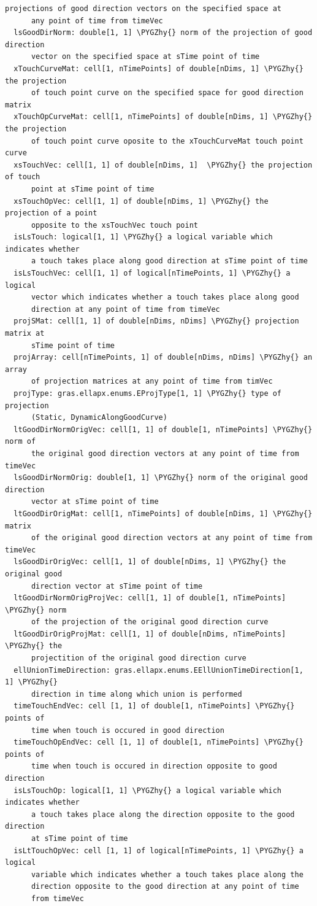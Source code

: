 \documentclass[letterpaper,10pt,english]{sphinxmanual}
\def\PYGZhy{\char`\-}
\begin{document}
\begin{Verbatim}[commandchars=\\\{\}]
      projections of good direction vectors on the specified space at
      any point of time from timeVec
  lsGoodDirNorm: double[1, 1] \PYGZhy{} norm of the projection of good direction
      vector on the specified space at sTime point of time
  xTouchCurveMat: cell[1, nTimePoints] of double[nDims, 1] \PYGZhy{} the projection
      of touch point curve on the specified space for good direction matrix
  xTouchOpCurveMat: cell[1, nTimePoints] of double[nDims, 1] \PYGZhy{} the projection
      of touch point curve oposite to the xTouchCurveMat touch point curve
  xsTouchVec: cell[1, 1] of double[nDims, 1]  \PYGZhy{} the projection of touch
      point at sTime point of time
  xsTouchOpVec: cell[1, 1] of double[nDims, 1] \PYGZhy{} the projection of a point
      opposite to the xsTouchVec touch point
  isLsTouch: logical[1, 1] \PYGZhy{} a logical variable which indicates whether
      a touch takes place along good direction at sTime point of time
  isLsTouchVec: cell[1, 1] of logical[nTimePoints, 1] \PYGZhy{} a logical
      vector which indicates whether a touch takes place along good
      direction at any point of time from timeVec
  projSMat: cell[1, 1] of double[nDims, nDims] \PYGZhy{} projection matrix at
      sTime point of time
  projArray: cell[nTimePoints, 1] of double[nDims, nDims] \PYGZhy{} an array
      of projection matrices at any point of time from timVec
  projType: gras.ellapx.enums.EProjType[1, 1] \PYGZhy{} type of projection
      (Static, DynamicAlongGoodCurve)
  ltGoodDirNormOrigVec: cell[1, 1] of double[1, nTimePoints] \PYGZhy{} norm of
      the original good direction vectors at any point of time from timeVec
  lsGoodDirNormOrig: double[1, 1] \PYGZhy{} norm of the original good direction
      vector at sTime point of time
  ltGoodDirOrigMat: cell[1, nTimePoints] of double[nDims, 1] \PYGZhy{} matrix
      of the original good direction vectors at any point of time from timeVec
  lsGoodDirOrigVec: cell[1, 1] of double[nDims, 1] \PYGZhy{} the original good
      direction vector at sTime point of time
  ltGoodDirNormOrigProjVec: cell[1, 1] of double[1, nTimePoints] \PYGZhy{} norm
      of the projection of the original good direction curve
  ltGoodDirOrigProjMat: cell[1, 1] of double[nDims, nTimePoints] \PYGZhy{} the
      projectition of the original good direction curve
  ellUnionTimeDirection: gras.ellapx.enums.EEllUnionTimeDirection[1, 1] \PYGZhy{}
      direction in time along which union is performed
  timeTouchEndVec: cell [1, 1] of double[1, nTimePoints] \PYGZhy{} points of
      time when touch is occured in good direction
  timeTouchOpEndVec: cell [1, 1] of double[1, nTimePoints] \PYGZhy{} points of
      time when touch is occured in direction opposite to good direction
  isLsTouchOp: logical[1, 1] \PYGZhy{} a logical variable which indicates whether
      a touch takes place along the direction opposite to the good direction
      at sTime point of time
  isLtTouchOpVec: cell [1, 1] of logical[nTimePoints, 1] \PYGZhy{} a logical
      variable which indicates whether a touch takes place along the
      direction opposite to the good direction at any point of time
      from timeVec
\end{Verbatim}
\end{document}
